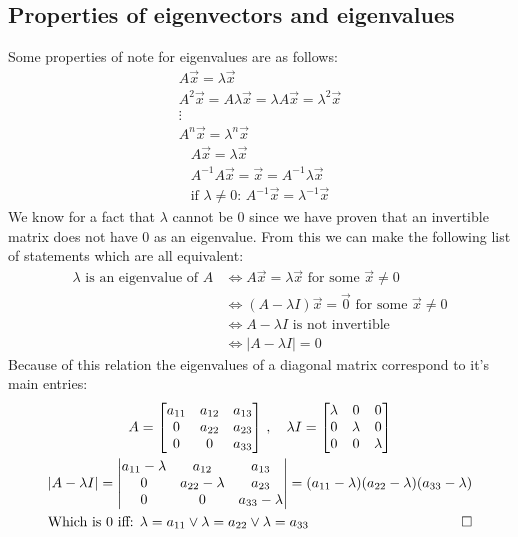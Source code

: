 \documentclass[11pt, a4paper]{article}
\newcommand*{\qed}{\hfill\ensuremath{\quad\square}}%
\begin{document}
\subsection{Properties of eigenvectors and eigenvalues}
Some properties of note for eigenvalues are as follows:
\begin{gather*}
  A\vec{x} = \lambda \vec{x}\\
  A^2\vec{x} = A \lambda \vec{x} = \lambda A\vec{x} = \lambda^2 \vec{x}\\
  \vdots\\
  A^n\vec{x} = \lambda^n \vec{x}
\end{gather*}
\begin{gather*}
  A\vec{x} = \lambda \vec{x}\\
  A^{-1} A \vec{x} = \vec{x} = A^{-1} \lambda \vec{x}\\
  \text{if $\lambda \neq 0$: } A^{-1} \vec{x} = \lambda^{-1} \vec{x}
\end{gather*}
We know for a fact that $\lambda$ cannot be $0$ since we have proven that an invertible matrix does not have $0$ as an eigenvalue. From this we can make the following list of statements which are all equivalent:
\begin{align*}
  \lambda \text{ is an eigenvalue of } A &\Leftrightarrow A\vec{x} = \lambda \vec{x} \text{ for some } \vec{x}\neq 0\\
                                         &\Leftrightarrow (A-\lambda I)\vec{x}=\vec{0} \text{ for some } \vec{x}\neq 0\\
                                         &\Leftrightarrow A-\lambda I \text{ is not invertible}\\
                                         &\Leftrightarrow |A -\lambda I| = 0
\end{align*}
Because of this relation the eigenvalues of a diagonal matrix correspond to it's main entries:
\begin{gather*}
  A = 
  \begin{bmatrix}
    a_{11} & a_{12} & a_{13}\\
    0      & a_{22} & a_{23}\\
    0      & 0      & a_{33}\\
  \end{bmatrix}
  \, , \quad
  \lambda I =
  \begin{bmatrix}
    \lambda& 0      & 0\\
    0      & \lambda& 0\\
    0      & 0      & \lambda\\
  \end{bmatrix}\\
  |A-\lambda I| =
  \begin{vmatrix}
    a_{11} - \lambda & a_{12}           & a_{13}\\
    0                & a_{22} - \lambda & a_{23}\\
    0                & 0                & a_{33} - \lambda\\
  \end{vmatrix}
  = (a_{11} -\lambda)(a_{22} - \lambda)(a_{33} - \lambda)\\
  \text{Which is $0$ iff: } \lambda = a_{11} \vee \lambda = a_{22} \vee \lambda = a_{33}\qed
\end{gather*}
\end{document}
